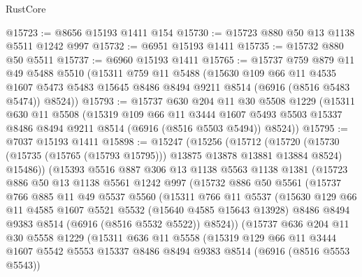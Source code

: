 \begin{lexlean}{RustCore}
\begin{coremodule}
@15723 := @8656 @15193 @1411 @154
@15730 := @15723 @880 @50 @13 @1138 @5511 @1242 @997
@15732 := @6951 @15193 @1411
@15735 := @15732 @880 @50 @5511
@15737 := @6960 @15193 @1411
@15765 := @15737
    @759
    @879
    @11
    @49
    @5488
    @5510
    (@15311
      @759
      @11
      @5488
      (@15630
        @109
        @66
        @11
        @4535
        @1607
        @5473
        @5483
        @15645
        @8486
        @8494
        @9211
        @8514
        (@6916 (@8516 @5483 @5474))
        @8524))
@15793 := @15737
    @630
    @204
    @11
    @30
    @5508
    @1229
    (@15311
      @630
      @11
      @5508
      (@15319
        @109
        @66
        @11
        @3444
        @1607
        @5493
        @5503
        @15337
        @8486
        @8494
        @9211
        @8514
        (@6916 (@8516 @5503 @5494))
        @8524))
@15795 := @7037 @15193 @1411
@15898 := @15247
    (@15256
      (@15712
        (@15720
          (@15730 (@15735 (@15765 (@15793 @15795))) @13875 @13878 @13881 @13884 @8524)
          @15486))
      (@15393
        @5516
        @887
        @306
        @13
        @1138
        @5563
        @1138
        @1381
        (@15723
          @886
          @50
          @13
          @1138
          @5561
          @1242
          @997
          (@15732
            @886
            @50
            @5561
            (@15737
              @766
              @885
              @11
              @49
              @5537
              @5560
              (@15311
                @766
                @11
                @5537
                (@15630
                  @129
                  @66
                  @11
                  @4585
                  @1607
                  @5521
                  @5532
                  (@15640 @4585 @15643 @13928)
                  @8486
                  @8494
                  @9383
                  @8514
                  (@6916 (@8516 @5532 @5522))
                  @8524))
              (@15737
                @636
                @204
                @11
                @30
                @5558
                @1229
                (@15311
                  @636
                  @11
                  @5558
                  (@15319
                    @129
                    @66
                    @11
                    @3444
                    @1607
                    @5542
                    @5553
                    @15337
                    @8486
                    @8494
                    @9383
                    @8514
                    (@6916 (@8516 @5553 @5543))

\end{coremodule}
\end{lexlean}
